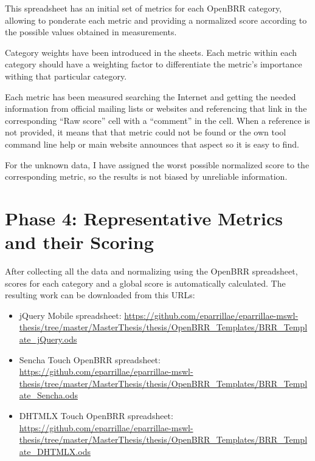 \documentclass[a4paper,12pt]{book}
\begin{document}
This spreadsheet has an initial set of metrics for each OpenBRR category, allowing to ponderate each metric and providing a normalized score according to the possible values obtained in measurements.

Category weights have been introduced in the sheets. Each metric within each
category should have a weighting factor to differentiate the metric's
importance withing that particular category. 

Each metric has been measured searching the Internet and getting the needed information from official mailing lists or websites and referencing that link in the corresponding ``Raw score'' cell with a ``comment'' in the cell. When a
reference is not provided, it means that that metric could not be found or the own tool command line help or main website announces that aspect so it is
easy to find.

For the unknown data, I have assigned the worst possible normalized score to
the corresponding metric, so the results is not biased by unreliable
information.

\section{Phase 4: Representative Metrics and their Scoring}
\label{sec:phase4}

After collecting all the data and normalizing using the OpenBRR spreadsheet,
scores for each category and a global score is automatically calculated.
The resulting work can be downloaded from this URLs:

\begin{itemize}
 \item jQuery Mobile spreadsheet:
\url{
https://github.com/eparrillae/eparrillae-mswl-thesis/tree/master/MasterThesis/thesis/OpenBRR_Templates/BRR_Template_jQuery.ods}

 \item Sencha Touch OpenBRR spreadsheet:
\url{
https://github.com/eparrillae/eparrillae-mswl-thesis/tree/master/MasterThesis/thesis/OpenBRR_Templates/BRR_Template_Sencha.ods}

 \item DHTMLX Touch OpenBRR spreadsheet:
\url{
https://github.com/eparrillae/eparrillae-mswl-thesis/tree/master/MasterThesis/thesis/OpenBRR_Templates/BRR_Template_DHTMLX.ods}

\end{itemize}

\end{document}
